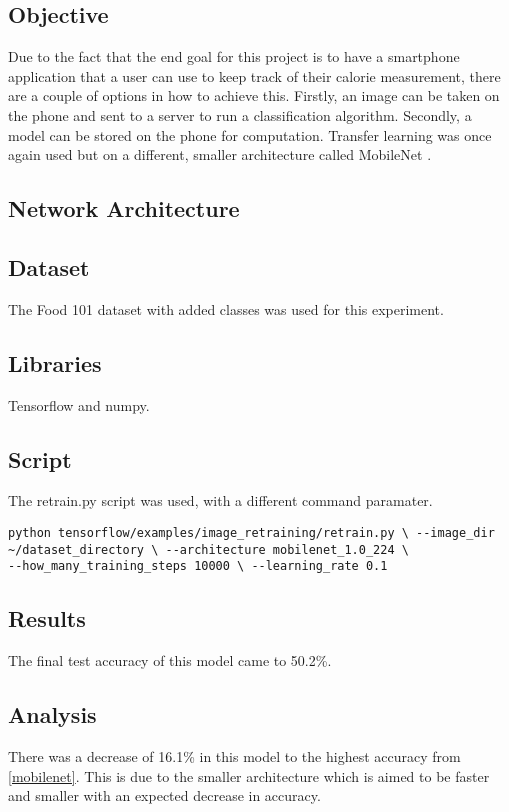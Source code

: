 \subsection*{Objective}
Due to the fact that the end goal for this project is to have a smartphone
application that a user can use to keep track of their calorie measurement,
there are a couple of options in how to achieve this. Firstly, an image can be
taken on the phone and sent to a server to run a classification algorithm.
Secondly, a model can be stored on the phone for computation. Transfer learning was once again used but on a different, smaller architecture called MobileNet \parencite{mobilenet}.

\subsection*{Network Architecture}

\subsection*{Dataset}
The Food 101 dataset \parencite{food101} with added classes was used for this experiment.

\subsection*{Libraries}
Tensorflow and numpy.

\subsection*{Script}
The retrain.py script \parencite{retrainInception} was used, with a different
command paramater.

\begin{lstlisting}
python tensorflow/examples/image_retraining/retrain.py \ --image_dir
~/dataset_directory \ --architecture mobilenet_1.0_224 \
--how_many_training_steps 10000 \ --learning_rate 0.1
\end{lstlisting}

\subsection*{Results}
The final test accuracy of this model came to 50.2\%.

\subsection*{Analysis}
There was a decrease of 16.1\% in this model to the highest accuracy from
\ref{mobilenet}. This is due to the smaller architecture which is aimed to be faster
and smaller with an expected decrease in accuracy.
